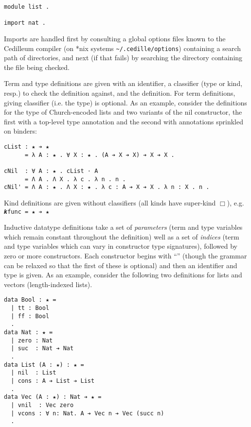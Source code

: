 \documentclass{article}
\begin{document}
\begin{verbatim}
module list .

import nat .
\end{verbatim}
\noindent Imports are handled first by consulting a global options files
known to the Cedilleum compiler (on *nix systems \verb|~/.cedille/options|)
containing a search path of directories, and next (if that fails) by searching
the directory containing the file being checked.

Term and type definitions are given with an identifier, a classifier (type or
kind, resp.) to check the definition against, and the definition. For term
definitions, giving classifier (i.e. the type) is optional. As an example,
consider the definitions for the type of Church-encoded lists and two variants
of the nil constructor, the first with a top-level type annotation and the
second with annotations sprinkled on binders:

\begin{verbatim}
cList : ★ ➔ ★
      = λ A : ★ . ∀ X : ★ . (A ➔ X ➔ X) ➔ X ➔ X .

cNil  : ∀ A : ★ . cList · A
      = Λ A . Λ X . λ c . λ n . n .
cNil' = Λ A : ★ . Λ X : ★ . λ c : A ➔ X ➔ X . λ n : X . n .
\end{verbatim}

Kind definitions are given without classifiers (all kinds have super-kind
$\Box$), e.g. \verb;𝒌func = ★ ➔ ★;

Inductive datatype definitions take a set of \textit{parameters} (term and type
variables which remain constant throughout the definition) well as a set of
\textit{indices} (term and type variables which can vary in constructor type
signatures), followed by zero or more constructors. Each constructor begins with
``\textbf{\textbar}'' (though the grammar can be relaxed so that the first of
these is optional) and then an identifier and type is given. As an example,
consider the following two definitions for lists and vectors (length-indexed
lists).

\begin{verbatim}
data Bool : ★ =
  | tt : Bool
  | ff : Bool
  .
data Nat : ★ =
  | zero : Nat
  | suc  : Nat ➔ Nat
  .
data List (A : ★) : ★ =
  | nil  : List
  | cons : A ➔ List ➔ List
  .
data Vec (A : ★) : Nat ➔ ★ =
  | vnil  : Vec zero
  | vcons : ∀ n: Nat. A ➔ Vec n ➔ Vec (succ n)
  .
\end{verbatim}
\end{document}

